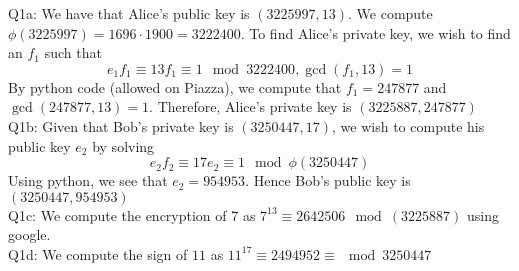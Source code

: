 \documentclass[letterpaper]{article}
\begin{document}
\noindent Q1a: We have that Alice's public key is $(3225997,13)$. We compute $\phi(3225997) = 1696\cdot 1900 = 3222400$. To find Alice's private key, we wish to find an $f_1$ such that $$e_1f_1 \equiv 13f_1 \equiv 1 \mod{3222400}, \gcd(f_1,13)=1$$
By python code (allowed on Piazza), we compute that $f_1=247877$ and $\gcd(247877,13)=1$. Therefore, Alice's private key is $(3225887,247877)$
\newline \\ Q1b: Given that Bob's private key is $(3250447,17)$, we wish to compute his public key $e_2$ by solving $$e_2f_2\equiv 17e_2 \equiv 1 \mod{\phi(3250447)}$$
Using python, we see that $e_2=954953$. Hence Bob's public key is $(3250447,954953)$
\newline \\ Q1c: We compute the encryption of 7 as $7^{13}\equiv 2642506\mod(3225887)$ using google. 
\newline \\ Q1d: We compute the sign of $11$ as $11^{17} \equiv 2494952 \equiv \mod{3250447}$
\end{document}
